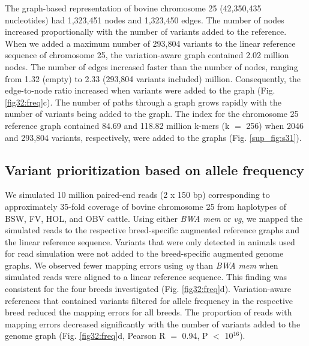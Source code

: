 \documentclass[../main.tex]{subfiles}
\begin{document}
The graph-based representation of bovine chromosome 25 (42,350,435 nucleotides) had 1,323,451 nodes and 1,323,450 edges. The number of nodes increased proportionally with the number of variants added to the reference. When we added a maximum number of 293,804 variants to the linear reference sequence of chromosome 25, the variation-aware graph contained 2.02 million nodes. The number of edges increased faster than the number of nodes, ranging from 1.32 (empty) to 2.33 (293,804 variants included) million. Consequently, the edge-to-node ratio increased when variants were added to the graph (Fig. \ref{fig32:freq}c). The number of paths through a graph grows rapidly with the number of variants being added to the graph. The index for the chromosome 25 reference graph contained 84.69 and 118.82 million k-mers (k $=$ 256) when 2046 and 293,804 variants, respectively, were added to the graphs (Fig. \ref{sup_fig:s31}).


\subsection*{Variant prioritization based on allele frequency}
We simulated 10 million paired-end reads (2 x 150 bp) corresponding to approximately 35-fold coverage of bovine chromosome 25 from haplotypes of BSW, FV, HOL, and OBV cattle. Using either \emph{BWA mem} or \emph{vg}, we mapped the simulated reads to the respective breed-specific augmented reference graphs and the linear reference sequence. Variants that were only detected in animals used for read simulation were not added to the breed-specific augmented genome graphs. We observed fewer mapping errors using \emph{vg} than \emph{BWA mem} when simulated reads were aligned to a linear reference sequence. This finding was consistent for the four breeds investigated (Fig. \ref{fig32:freq}d). Variation-aware references that contained variants filtered for allele frequency in the respective breed reduced the mapping errors for all breeds. The proportion of reads with mapping errors decreased significantly with the number of variants added to the genome graph (Fig. \ref{fig32:freq}d, Pearson R $=$ 0.94, P $<$ 10$^{16}$).
\end{document}
